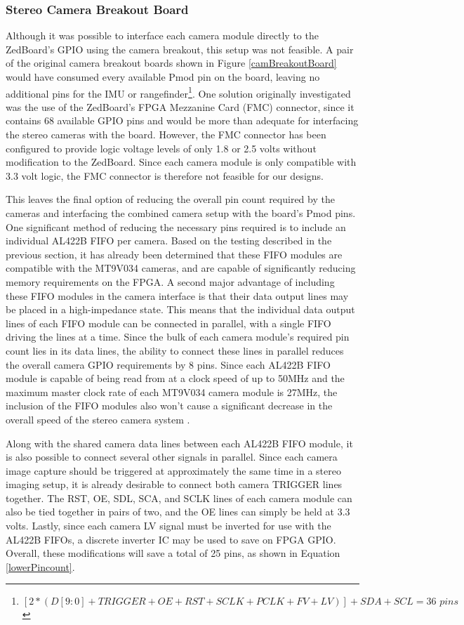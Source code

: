 \subsubsection{Stereo Camera Breakout Board}
Although it was possible to interface each camera module directly to the ZedBoard's GPIO using the camera breakout, this setup was not feasible. A pair of the original camera breakout boards shown in Figure \ref{camBreakoutBoard} would have consumed every available Pmod pin on the board, leaving no additional pins for the IMU or rangefinder\footnote{$[2*(D[9:0]+TRIGGER+OE+RST+SCLK+PCLK+FV+LV)]+SDA+SCL = 36\,\,pins$}. One solution originally investigated was the use of the ZedBoard's FPGA Mezzanine Card (FMC) connector, since it contains 68 available GPIO pins and would be more than adequate for interfacing the stereo cameras with the board. However, the FMC connector has been configured to provide logic voltage levels of only 1.8 or 2.5 volts without modification to the ZedBoard. Since each camera module is only compatible with 3.3 volt logic, the FMC connector is therefore not feasible for our designs.
\par
This leaves the final option of reducing the overall pin count required by the cameras and interfacing the combined camera setup with the board's Pmod pins. One significant method of reducing the necessary pins required is to include an individual AL422B FIFO per camera. Based on the testing described in the previous section, it has already been determined that these FIFO modules are compatible with the MT9V034 cameras, and are capable of significantly reducing memory requirements on the FPGA. A second major advantage of including these FIFO modules in the camera interface is that their data output lines may be placed in a high-impedance state. This means that the individual data output lines of each FIFO module can be connected in parallel, with a single FIFO driving the lines at a time. Since the bulk of each camera module's required pin count lies in its data lines, the ability to connect these lines in parallel reduces the overall camera GPIO requirements by 8 pins. Since each AL422B FIFO module is capable of being read from at a clock speed of up to 50MHz and the maximum master clock rate of each MT9V034 camera module is 27MHz, the inclusion of the FIFO modules also won't cause a significant decrease in the overall speed of the stereo camera system \cite{al422b,mt9v034}.
\par
Along with the shared camera data lines between each AL422B FIFO module, it is also possible to connect several other signals in parallel. Since each camera image capture should be triggered at approximately the same time in a stereo imaging setup, it is already desirable to connect both camera TRIGGER lines together. The RST, OE, SDL, SCA, and SCLK lines of each camera module can also be tied together in pairs of two, and the OE lines can simply be held at 3.3 volts. Lastly, since each camera LV signal must be inverted for use with the AL422B FIFOs, a discrete inverter IC may be used to save on FPGA GPIO. Overall, these modifications will save a total of 25 pins, as shown in Equation \ref{lowerPincount}.
